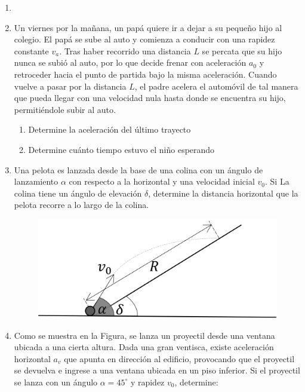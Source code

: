 \documentclass[letterpaper,11pt]{article}
\begin{document}
\vspace{-1cm}
\begin{enumerate}\setlength{\itemsep}{0.4cm}

\item[]

\item Un viernes por la mañana, un papá quiere ir a dejar a su pequeño hijo al colegio. El papá se sube al auto y comienza a conducir con una rapidez constante $v_a$. Tras haber recorrido una distancia $L$ se percata que su hijo nunca se subió al auto, por lo que decide frenar con aceleración $a_{0}$ y retroceder hacia el punto de partida bajo la misma aceleración. Cuando vuelve a pasar por la distancia $L$, el padre acelera el automóvil de tal manera que pueda llegar con una velocidad nula hasta donde se encuentra su hijo, permitiéndole subir al auto.

\begin{enumerate}
    \item Determine la aceleración del último trayecto
    \item Determine cuánto tiempo estuvo el niño esperando
\end{enumerate}

\item 
\begin{multicols}{2}
    Una pelota es lanzada desde la base de una colina con un ángulo de lanzamiento $\alpha$ con respecto a la horizontal y una velocidad inicial $v_0$. Si La colina tiene un ángulo de elevación $\delta$, determine la distancia horizontal que la pelota recorre a lo largo de la colina.

    \columnbreak
    
    \begin{figure}[H]
        \centering
        \includegraphics[width=0.8\linewidth]{2023-1/img/TD 2/plano.png}
    \end{figure}
\end{multicols}

\item 
\begin{multicols}{2}
Como se muestra en la Figura, se lanza un proyectil desde una ventana ubicada a una cierta altura. Dada una gran ventisca, existe aceleración horizontal $a_v$ que apunta en dirección al edificio, provocando que el proyectil se devuelva e ingrese a una ventana ubicada en un piso inferior. Si el proyectil se lanza con un ángulo $\alpha=45^{\circ}$ y rapidez $v_0$, determine:


\end{multicols}
\end{enumerate}
\end{document}
